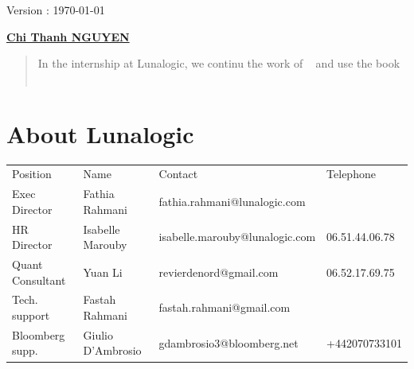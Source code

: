 \documentclass[a4paper,10pt]{article}
\begin{document}
\begin{titlepage}
\vspace{2cm}

\begin{center}
\end{center}
\begin{center}
\huge{ Version : \today }
\end{center}


\begin{center}
\href{mailto:chithanhnguyen.math@gmail.com}{\LARGE{\textbf{Chi Thanh NGUYEN}}}
\end{center}



\vfill
\begin{abstract}
In the internship at Lunalogic, we continu the work of ~\cite{THAI2013} and use the book  ~\cite{BRIGO2006} ~\cite{BRIGO2005}
\end{abstract}
\end{titlepage}


\tableofcontents
\newpage

\newpage
\section{About Lunalogic}
\begin{tabular}{llll}
Position          &            Name              & Contact                        &Telephone      \\
Exec Director     & Fathia Rahmani               & fathia.rahmani@lunalogic.com   &               \\
HR   Director     & Isabelle Marouby             & isabelle.marouby@lunalogic.com &06.51.44.06.78 \\
Quant Consultant  & Yuan Li                      & revierdenord@gmail.com         &06.52.17.69.75 \\    
Tech. support     & Fastah Rahmani               & fastah.rahmani@gmail.com       &               \\ 
Bloomberg supp.   & Giulio D'Ambrosio            & gdambrosio3@bloomberg.net      &+442070733101  \\
\end{tabular}
\end{document}
